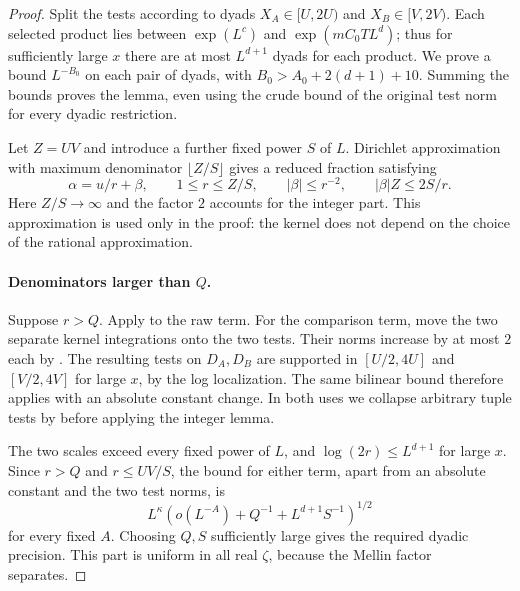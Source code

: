 \begin{proof}
Split the tests according to dyads $X_A\in[U,2U)$ and
$X_B\in[V,2V)$.  Each selected product lies between
$\exp(L^c)$ and $\exp(mC_0T L^d)$; thus for sufficiently large
$x$ there are at most $L^{d+1}$ dyads for each product.
We prove a bound $L^{-B_0}$ on each pair of dyads, with
$B_0>A_0+2(d+1)+10$.  Summing the bounds proves the lemma,
even using the crude bound of the original test norm for every
dyadic restriction.

Let $Z=UV$ and introduce a further fixed power $S$ of $L$.
Dirichlet approximation with maximum denominator
$\lfloor Z/S\rfloor$ gives a reduced fraction satisfying
\begin{equation}\label{eq:ideal-dirichlet}
 \alpha=u/r+\beta,\qquad
 1\leq r\leq Z/S,\qquad |\beta|\leq r^{-2},\qquad
 |\beta|Z\leq 2S/r.
\end{equation}
Here $Z/S\to\infty$ and the factor $2$ accounts for the integer
part.  This approximation is used only in the proof: the kernel
does not depend on the choice of the rational approximation.

\paragraph{Denominators larger than $Q$.}
Suppose $r>Q$.  Apply  to
the raw term.  For the comparison term, move the two separate
kernel integrations onto the two tests.  Their norms increase
by at most $2$ each by .  The resulting
tests on $D_A,D_B$ are supported in $[U/2,4U]$ and $[V/2,4V]$
for large $x$, by the log localization.  The same bilinear bound
therefore applies with an absolute constant change.
In both uses we collapse arbitrary tuple tests by
 before applying the integer lemma.

The two scales exceed every fixed power of $L$, and
$\log(2r)\leq L^{d+1}$ for large $x$.  Since $r>Q$ and
$r\leq UV/S$, the bound for either term, apart from an absolute
constant and the two test norms, is
\begin{equation}\label{eq:ideal-minor-error}
 L^\kappa
 \left(o(L^{-A})+Q^{-1}+L^{d+1}S^{-1}\right)^{1/2}
\end{equation}
for every fixed $A$.  Choosing $Q,S$ sufficiently large gives
the required dyadic precision.  This part is uniform in all
real $\zeta$, because the Mellin factor separates.


\end{proof}
